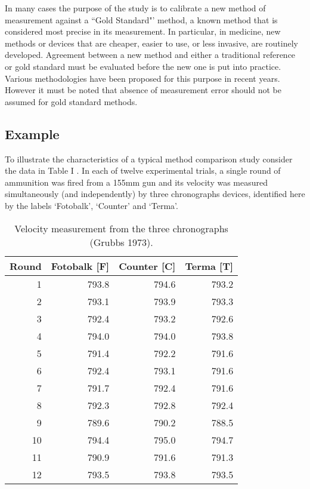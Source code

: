 \documentclass[12pt, a4paper]{report}
\theoremstyle{plain}
\theoremstyle{definition}
\theoremstyle{remark}
\begin{document}
	In many cases the purpose of the study is to calibrate a new method of measurement against a ``Gold Standard"’ method, a known method that is considered most precise in its measurement. In particular, in medicine, new methods or devices that are cheaper, easier to use, or less invasive, are routinely developed. Agreement between a new method and either a traditional reference or gold standard must be evaluated before the new one is put into practice. Various methodologies have been proposed for this purpose in recent years. However it must be noted that absence of measurement error should not be assumed for gold standard methods.
	
	
\subsection{Example}	

	To illustrate the characteristics of a typical method comparison
	study consider the data in Table I \citep{Grubbs73}. In each of
	twelve experimental trials, a single round of ammunition was fired
	from a 155mm gun and its velocity was measured simultaneously (and
	independently) by three chronographs devices, identified here by
	the labels `Fotobalk', `Counter' and `Terma'.
	\smallskip
	
	
	\begin{table}[ht]
		\begin{center}
			\begin{tabular}{rrrr}
				\hline
				Round& Fotobalk [F] & Counter [C]& Terma [T]\\
				\hline
				1 & 793.8 & 794.6 & 793.2 \\
				2 & 793.1 & 793.9 & 793.3 \\
				3 & 792.4 & 793.2 & 792.6 \\
				4 & 794.0 & 794.0 & 793.8 \\
				5 & 791.4 & 792.2 & 791.6 \\
				6 & 792.4 & 793.1 & 791.6 \\
				7 & 791.7 & 792.4 & 791.6 \\
				8 & 792.3 & 792.8 & 792.4 \\
				9 & 789.6 & 790.2 & 788.5 \\
				10 & 794.4 & 795.0 & 794.7 \\
				11 & 790.9 & 791.6 & 791.3 \\
				12 & 793.5 & 793.8 & 793.5 \\
				\hline
			\end{tabular}
			\caption{Velocity measurement from the three chronographs (Grubbs
				1973).}
		\end{center}
		\label{FCTdata}
	\end{table}
	
\end{document}
